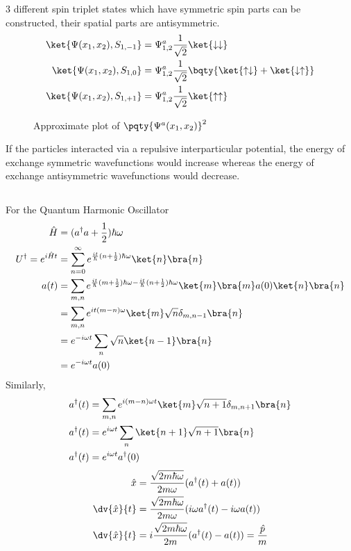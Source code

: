 \documentclass[12pt]{article}
\begin{document}
\subsubsection{} 3 different spin triplet states which have symmetric spin parts can be constructed, their spatial parts are antisymmetric.
\begin{align*}
\ket{\Psi(x_1,x_2), S_{1, - 1}} &=  \Psi^a_{1,2} \frac{1}{\sqrt{2}} \ket{\downarrow\downarrow}\\
\ket{\Psi(x_1,x_2), S_{1,0}} &=  \Psi^a_{1,2} \frac{1}{\sqrt{2}} \bqty{\ket{\uparrow\downarrow} + \ket{\downarrow\uparrow} }\\
\ket{\Psi(x_1,x_2), S_{1, + 1}} &=  \Psi^a_{1,2} \frac{1}{\sqrt{2}} \ket{\uparrow\uparrow}
\end{align*}
\begin{figure}[tbp]
\centering
\def\svgwidth{200pt}
\caption{Approximate plot of \(\pqty{\Psi^a(x_1,x_2)}^2\)}
\end{figure}
If the particles interacted via a repulsive interparticular potential, the energy of exchange symmetric wavefunctions would increase whereas the energy of exchange antisymmetric wavefunctions would decrease.
\subsection{} For the Quantum Harmonic Oscillator \begin{align*}
\hat{H} &=  (a^\dagger a + \frac{1}{2})\hbar\omega \\
U^\dagger  =e^{i\hat{H}t} &= \sum_{n = 0}^{\infty}e^{\frac{it}{ \hbar}(n + \frac{1}{2})\hbar\omega }\ket{n} \bra{n}\\
a(t) &=  \sum_{m,n}e^{\frac{it}{ \hbar}(m + \frac{1}{2})\hbar\omega - \frac{it}{\hbar}(n + \frac{1}{2})\hbar\omega } \ket{m}\bra{m} a(0) \ket{n} \bra{n} \\
&= \sum_{m,n}e^{it(m - n) \omega } \ket{m} \sqrt{n} \delta_{m,n - 1} \bra{n} \\
&= e^{ -i \omega t} \sum_n \sqrt{n} \ket{n - 1} \bra{n} \\
&= e^{ -i \omega t} a(0)
\end{align*}
Similarly,
\begin{align*}
a^\dagger (t) &=  \sum_{m,n}e^{i(m - n) \omega t} \ket{m} \sqrt{n + 1} \delta_{m,n + 1} \bra{n} \\
a^\dagger (t) &= e^{i \omega t} \sum_{n} \ket{n + 1} \sqrt{n + 1} \bra{n} \\
a^\dagger (t) &= e^{i \omega t} a^\dagger (0) 
\end{align*}
\begin{align*}
\hat{x} &=  \frac{\sqrt{2m \hbar\omega} }{2m\omega }  (a^\dagger(t) + a(t))\\
\dv{\hat{x}}{t} &= \frac{\sqrt{2m \hbar\omega}}{2m\omega } (i \omega a^\dagger(t) - i \omega  a(t))\\
\dv{\hat{x}}{t} &= i \frac{\sqrt{2m \hbar\omega}}{2m }  (a^\dagger(t) -  a(t)) = \frac{\hat{p}}{m} 
\end{align*}
\end{document}
